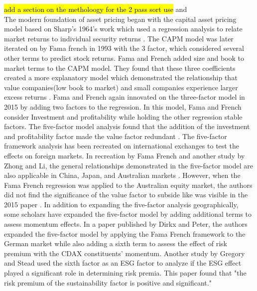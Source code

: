 \documentclass[12pt,oneside,reqno]{amsart}
\begin{document}
 \hl{add a section on the metholoogy for the 2 pass sort use} \cite{Kleibergen2013UnexplainedFA} and \cite{Fama1973RiskRA} \\
The modern foundation of asset pricing began with the capital asset pricing model based on Sharp's 1964's work which used a regression analysis to relate market returns to individual security returns \cite{Sharpe1964CAPITALAP}. The CAPM model was later iterated on by Fama french in 1993 with the 3 factor, which considered several other terms to predict stock returns. Fama and French added size and book to market terms to the CAPM model. They found that these three coefficients created a more explanatory model which demonstrated the relationship that value companies(low book to market) and small companies experience larger excess returns \cite{Fama1992TheCO}. Fama and French again innovated on the three-factor model in 2015 by adding two factors to the regression. In this model, Fama and French consider Investment and profitability while holding the other regression stable factors. The five-factor model analysis found that the addition of the investment and profitability factor made the value factor redundant \cite{Fama2013AFA}. The five-factor framework analysis has been recreated on international exchanges to test the effects on foreign markets. In recreation by Fama French and another study by Zhong and Li, the general relationships demonstrated in the five-factor model are also applicable in China, Japan, and Australian markets \cite{Fama2015InternationalTO, LIN2017141, Chiah2016A}. However, when the Fama French regression was applied to the Australian equity market, the authors did not find the significance of the value factor to subside like was visible in the 2015 paper \cite{Chiah2016A}.  In addition to expanding the five-factor analysis geographically, some scholars have expanded the five-factor model by adding additional terms to assess momentum effects.  In a paper published by  Dirkx and  Peter, the authors expanded the five-factor model by applying the Fama French framework to the German market while also adding a sixth term to assess the effect of risk premium with the CDAX constituents' momentum. Another study by Gregory and Stead used the sixth factor as an ESG factor to analyze if the ESG effect played a significant role in determining risk premia. This paper found that  "the risk premium of the sustainability factor is positive and significant\cite{Gregory2020TheGP}."
\end{document}
